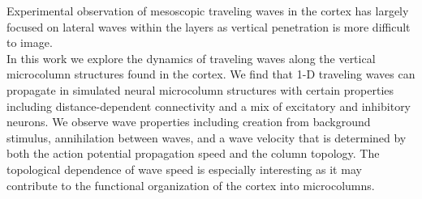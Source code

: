 \documentclass[a4paper,11pt]{article}
\begin{document}
Experimental observation of mesoscopic traveling waves in the cortex has largely focused on lateral waves within the layers \cite{muller2018} as vertical penetration is more difficult to image. 
\\
In this work we explore the dynamics of traveling waves along the vertical microcolumn structures found in the cortex.
We find that 1-D traveling waves can propagate in simulated neural microcolumn structures with certain properties including distance-dependent connectivity and a mix of excitatory and inhibitory neurons. 
We observe wave properties including creation from background stimulus, annihilation between waves, and a wave velocity that is determined by both the action potential propagation speed and the column topology. 
The topological dependence of wave speed is especially interesting as it may contribute to the functional organization of the cortex into microcolumns.
\end{document}

